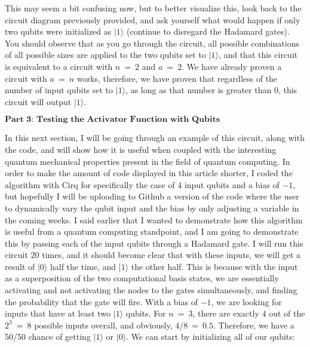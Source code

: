 \documentclass{article}
\begin{document}
This may seem a bit confusing now, but to better visualize this, look back to the circuit diagram previously provided, and ask yourself what would happen if only two qubits were initialized as $|1\rangle$ (continue to disregard the Hadamard gates). You should observe that as you go through the circuit, all possible combinations of all possible sizes are applied to the two qubits set to $|1\rangle$, and that this circuit is equivalent to a circuit with $n \ = \ 2$ and $a \ = \ 2$. We have already proven a circuit with $a \ = \ n$ works, therefore, we have proven that regardless of the number of input qubits set to $|1\rangle$, as long as that number is greater than $0$, this circuit will output $|1\rangle$.
\newline\newline
\begin{center}
$\textbf{Part 3: Testing the Activator Function with Qubits}$
\end{center}
\newline\newline
In this next section, I will be going through an example of this circuit, along with the code, and will show how it is useful when coupled with the interesting quantum mechanical properties present in the field of quantum computing.
\newline\newline
In order to make the amount of code displayed in this article shorter, I coded the algorithm with Cirq for specifically the case of $4$ input qubits and a bias of $-1$, but hopefully I will be uploading to Github a version of the code where the user to dynamically vary the qubit input and the bias by only adjusting a variable in the coming weeks. I said earlier that I wanted to demonstrate how this algorithm is useful from a quantum computing standpoint, and I am going to demonstrate this by passing each of the input qubits through a Hadamard gate. I will run this circuit $20$ times, and it should become clear that with these inputs, we will get a result of $|0\rangle$ half the time, and $|1\rangle$ the other half. This is because with the input as a superposition of the two computational basis states, we are essentially activating and not activating the nodes to the gates simultaneously, and finding the probability that the gate will fire. With a bias of $-1$, we are looking for inputs that have at least two $|1\rangle$ qubits. For $n \ = \ 3$, there are exactly $4$ out of the $2^3 \ = \ 8$ possible inputs overall, and obviously, $4/8 \ = \ 0.5$. Therefore, we have a 50/50 chance of getting $|1\rangle$ or $|0\rangle$. We can start by initializing all of our qubits:
\end{document}
